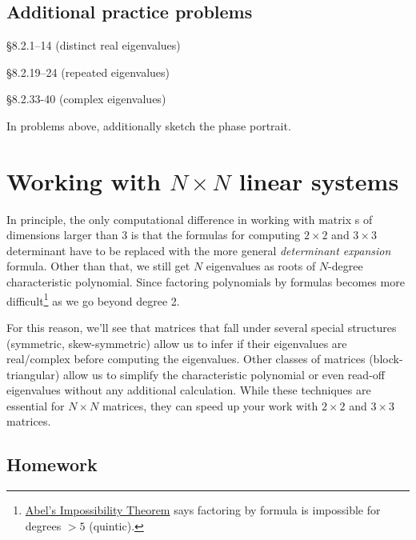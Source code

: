 \subsection*{Additional practice problems}

\begin{compactenum}[(a)]
\item {} \S 8.2.1--14 (distinct real eigenvalues)
\item {} \S 8.2.19--24 (repeated eigenvalues)
\item {} \S 8.2.33-40 (complex eigenvalues)
\end{compactenum}
In problems above, additionally sketch the phase portrait.






\section{Working with \(N \times N\) linear systems}

\begin{weekintro}
  In principle, the only computational difference in working with matrix \ode{}s of dimensions larger than 3 is that the formulas for computing \(2 \times 2\) and \(3 \times 3\) determinant have to be replaced with the more general \emph{determinant expansion} formula. Other than that, we still get \(N\) eigenvalues as roots of \(N\)-degree characteristic polynomial. Since factoring polynomials by formulas becomes more difficult\footnote{\href{https://goo.gl/iAd3XQ}{Abel's Impossibility Theorem} says factoring by formula is impossible for degrees \(> 5\) (quintic).} as we go beyond degree 2.

  For this reason, we'll see that matrices that fall under several special structures (symmetric, skew-symmetric) allow us to infer if their eigenvalues are real/complex before computing the eigenvalues.  Other classes of matrices (block-triangular) allow us to simplify the characteristic polynomial or even read-off eigenvalues without any additional calculation. While these techniques are essential for \(N \times N\) matrices, they can speed up your work with \(2\times 2\) and \(3 \times 3\) matrices.
\end{weekintro}

\subsection*{Homework}


